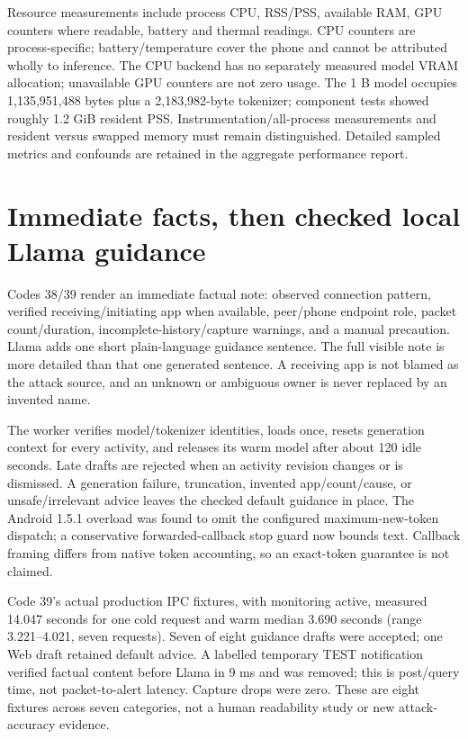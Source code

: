 \documentclass[11pt,a4paper,oneside]{report}
\begin{document}
Resource measurements include process CPU, RSS/PSS, available RAM, GPU counters where readable, battery and thermal readings. CPU counters are process-specific; battery/temperature cover the phone and cannot be attributed wholly to inference. The CPU backend has no separately measured model VRAM allocation; unavailable GPU counters are not zero usage. The 1 B model occupies 1,135,951,488 bytes plus a 2,183,982-byte tokenizer; component tests showed roughly 1.2 GiB resident PSS. Instrumentation/all-process measurements and resident versus swapped memory must remain distinguished. Detailed sampled metrics and confounds are retained in the aggregate performance report.

\section{Immediate facts, then checked local Llama guidance}
Codes 38/39 render an immediate factual note: observed connection pattern, verified receiving/initiating app when available, peer/phone endpoint role, packet count/duration, incomplete-history/capture warnings, and a manual precaution. Llama adds one short plain-language guidance sentence. The full visible note is more detailed than that one generated sentence. A receiving app is not blamed as the attack source, and an unknown or ambiguous owner is never replaced by an invented name.

The worker verifies model/tokenizer identities, loads once, resets generation context for every activity, and releases its warm model after about 120 idle seconds. Late drafts are rejected when an activity revision changes or is dismissed. A generation failure, truncation, invented app/count/cause, or unsafe/irrelevant advice leaves the checked default guidance in place. The Android 1.5.1 overload was found to omit the configured maximum-new-token dispatch; a conservative forwarded-callback stop guard now bounds text. Callback framing differs from native token accounting, so an exact-token guarantee is not claimed.

Code 39's actual production IPC fixtures, with monitoring active, measured 14.047 seconds for one cold request and warm median 3.690 seconds (range 3.221--4.021, seven requests). Seven of eight guidance drafts were accepted; one Web draft retained default advice. A labelled temporary TEST notification verified factual content before Llama in 9 ms and was removed; this is post/query time, not packet-to-alert latency. Capture drops were zero. These are eight fixtures across seven categories, not a human readability study or new attack-accuracy evidence.
\end{document}
